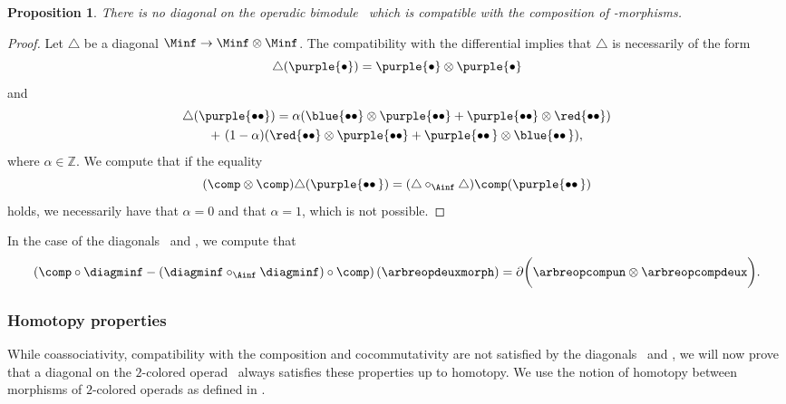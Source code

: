 \documentclass[JEP,XML,SOM,NoFloatCountersInSection,Unicode,published]{cedram}
\newcommand{\twobullets}{\bullet\bullet\mkern3mu}
\theoremstyle{definition}
\theoremstyle{plain}
\newtheorem{proposition}[definition]{Proposition}
\begin{document}
\begin{proposition}
\label{thm:nofunctorial}
There is no diagonal on the operadic bimodule \Minf\ which is compatible with the composition of \Ainf -morphisms.
\end{proposition}

\begin{proof}
Let $\triangle$ be a diagonal $\Minf \to \Minf \otimes \Minf$.
The compatibility with the differential implies that $\triangle$ is necessarily of the form
\[
\triangle(\purple{\bullet }) = \purple{\bullet } \otimes \purple{\bullet }
\]
and
\begin{multline*}
\triangle (\purple{\bullet \bullet }) =\alpha (\blue{\bullet \bullet }\otimes \purple{\bullet \bullet } + \purple{\bullet \bullet }\otimes\red{\bullet \bullet }) \\ + \ (1-\alpha)(\red{\bullet \bullet }\otimes \purple{\bullet \bullet }+\purple{\twobullets}\otimes \blue{\twobullets}),
\end{multline*}
where $\alpha \in \mathbb{Z}$.
We compute that if the equality
\[
(\comp \otimes \comp) \triangle (\purple{\twobullets}) = (\triangle \circ_{\Ainf} \triangle) \comp (\purple{\twobullets})
\]
holds, we necessarily have that $\alpha = 0$ and that $\alpha =1$, which is not possible.
\end{proof}

In the case of the diagonals \diagainf\ and \diagminf, we compute that
\[
\left(\comp \circ \diagminf - (\diagminf \circ_{\Ainf} \diagminf) \circ \comp \right) \left(\arbreopdeuxmorph \right) = \partial \biggl(\arbreopcompun \otimes \arbreopcompdeux \biggr).
\]

\subsubsection{Homotopy properties}

While coassociativity, compatibility with the composition and cocommutativity are not satisfied by the diagonals \diagainf\ and \diagminf, we will now prove that a diagonal on the $2$-colored operad \Ainfdeux\ always satisfies these properties up to homotopy.
We use the notion of homotopy between morphisms of $2$-colored operads as defined in \cite[\S 3.10]{MSS}.
\end{document}
